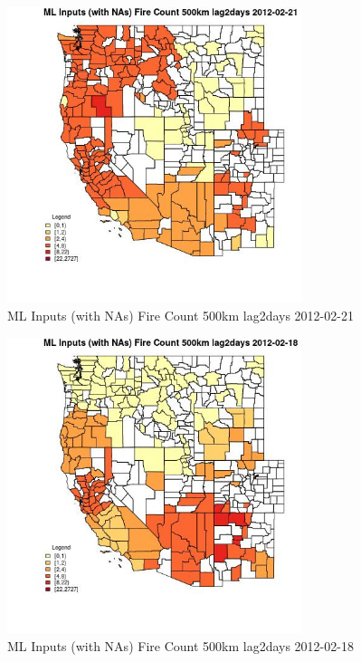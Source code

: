 \begin{figure} 
\centering  
\includegraphics[width=0.77\textwidth]{Code_Outputs/Report_ML_input_PM25_Step4_part_f_de_duplicated_aveswNAs_CountyFire_Count_500km_lag2daysMean2012-02-21.jpg} 
\caption{\label{fig:Report_ML_input_PM25_Step4_part_f_de_duplicated_aveswNAsCountyFire_Count_500km_lag2daysMean2012-02-21}ML Inputs (with NAs) Fire Count 500km lag2days 2012-02-21} 
\end{figure} 
 

\begin{figure} 
\centering  
\includegraphics[width=0.77\textwidth]{Code_Outputs/Report_ML_input_PM25_Step4_part_f_de_duplicated_aveswNAs_CountyFire_Count_500km_lag2daysMean2012-02-18.jpg} 
\caption{\label{fig:Report_ML_input_PM25_Step4_part_f_de_duplicated_aveswNAsCountyFire_Count_500km_lag2daysMean2012-02-18}ML Inputs (with NAs) Fire Count 500km lag2days 2012-02-18} 
\end{figure} 
 

